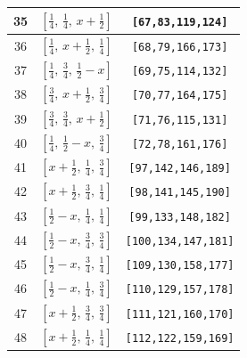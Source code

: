 \documentclass[fleqn,8pt]{jsarticle}
\begin{document}
\begin{longtable}{ccc}
35 & $\left[ \frac{1}{4},\, \frac{1}{4},\, x + \frac{1}{2} \right]$ & {\tt [67,83,119,124]} \\ \hline
36 & $\left[ \frac{1}{4},\, x + \frac{1}{2},\, \frac{1}{4} \right]$ & {\tt [68,79,166,173]} \\ \hline
37 & $\left[ \frac{1}{4},\, \frac{3}{4},\, \frac{1}{2} - x \right]$ & {\tt [69,75,114,132]} \\ \hline
38 & $\left[ \frac{3}{4},\, x + \frac{1}{2},\, \frac{3}{4} \right]$ & {\tt [70,77,164,175]} \\ \hline
39 & $\left[ \frac{3}{4},\, \frac{3}{4},\, x + \frac{1}{2} \right]$ & {\tt [71,76,115,131]} \\ \hline
40 & $\left[ \frac{1}{4},\, \frac{1}{2} - x,\, \frac{3}{4} \right]$ & {\tt [72,78,161,176]} \\ \hline
41 & $\left[ x + \frac{1}{2},\, \frac{1}{4},\, \frac{3}{4} \right]$ & {\tt [97,142,146,189]} \\ \hline
42 & $\left[ x + \frac{1}{2},\, \frac{3}{4},\, \frac{1}{4} \right]$ & {\tt [98,141,145,190]} \\ \hline
43 & $\left[ \frac{1}{2} - x,\, \frac{1}{4},\, \frac{1}{4} \right]$ & {\tt [99,133,148,182]} \\ \hline
44 & $\left[ \frac{1}{2} - x,\, \frac{3}{4},\, \frac{3}{4} \right]$ & {\tt [100,134,147,181]} \\ \hline
45 & $\left[ \frac{1}{2} - x,\, \frac{3}{4},\, \frac{1}{4} \right]$ & {\tt [109,130,158,177]} \\ \hline
46 & $\left[ \frac{1}{2} - x,\, \frac{1}{4},\, \frac{3}{4} \right]$ & {\tt [110,129,157,178]} \\ \hline
47 & $\left[ x + \frac{1}{2},\, \frac{3}{4},\, \frac{3}{4} \right]$ & {\tt [111,121,160,170]} \\ \hline
48 & $\left[ x + \frac{1}{2},\, \frac{1}{4},\, \frac{1}{4} \right]$ & {\tt [112,122,159,169]} \\
\end{longtable}
\renewcommand{\arraystretch}{1.2}
\end{document}
